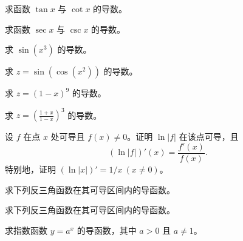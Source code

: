 \noindent\begin{minipage}{\textwidth}
求函数 $\tan x$ 与 $\cot x$ 的导数。
\end{minipage}\par\vfill
\noindent\begin{minipage}{\textwidth}
求函数 $\sec x$ 与 $\csc x$ 的导数。
\end{minipage}\par\vfill
\noindent\begin{minipage}{\textwidth}
求 $\sin(x^3)$ 的导数。
\end{minipage}\par\vfill
\newpage
\noindent\begin{minipage}{\textwidth}
求 $z=\sin(\cos(x^2))$ 的导数。
\end{minipage}\par\vfill
\noindent\begin{minipage}{\textwidth}
求 $z=(1-x)^9$ 的导数。
\end{minipage}\par\vfill
\noindent\begin{minipage}{\textwidth}
求 $\displaystyle z=\left(\frac{1+x}{1-x}\right)^3$ 的导数。
\end{minipage}\par\vfill
\noindent\begin{minipage}{\textwidth}
设 $f$ 在点 $x$ 处可导且 $f(x)\ne0$。证明 $\ln|f|$ 在该点可导，且\[(\ln|f|)'(x)=\frac{f'(x)}{f(x)}.\]特别地，证明 $(\ln|x|)'=1/x\ (x\ne0)$。
\end{minipage}\par\vfill
\newpage
\noindent\begin{minipage}{\textwidth}
求下列反三角函数在其可导区间内的导函数。
\end{minipage}\par\vfill
\noindent\begin{minipage}{\textwidth}
求下列反三角函数在其可导区间内的导函数。
\end{minipage}\par\vfill
\noindent\begin{minipage}{\textwidth}
求指数函数 $y=a^x$ 的导函数，其中 $a>0$ 且 $a\ne1$。
\end{minipage}\par\vfill
